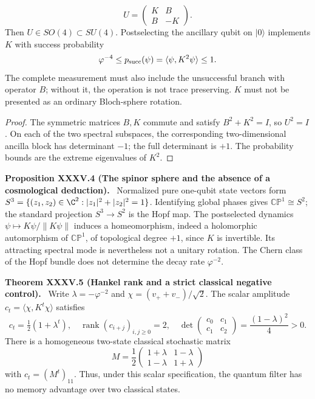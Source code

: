 \documentclass[11pt,a4paper,oneside]{book}
\DeclareMathOperator{\rank}{rank}\DeclareMathOperator{\Tr}{Tr}
\newcommand{\statement}[3]{\par\medskip\noindent\textbf{#1 #2 (#3).}\ }
\begin{document}
\[U=\begin{pmatrix}K&B\\B&-K\end{pmatrix}.\]
Then $U\in SO(4)\subset SU(4)$. Postselecting the ancillary qubit on $|0\rangle$ implements $K$ with success probability
\[\varphi^{-4}\le p_{\rm succ}(\psi)=\langle\psi,K^2\psi\rangle\le1.\]
The complete measurement must also include the unsuccessful branch with operator $B$; without it, the operation is not trace preserving. $K$ must not be presented as an ordinary Bloch-sphere rotation.
\begin{proof}
The symmetric matrices $B,K$ commute and satisfy $B^2+K^2=I$, so $U^2=I$. On each of the two spectral subspaces, the corresponding two-dimensional ancilla block has determinant $-1$; the full determinant is $+1$. The probability bounds are the extreme eigenvalues of $K^2$.
\end{proof}
\statement{Proposition}{XXXV.4}{The spinor sphere and the absence of a cosmological deduction}
Normalized pure one-qubit state vectors form $S^3=\{(z_1,z_2)\in\C^2:|z_1|^2+|z_2|^2=1\}$. Identifying global phases gives $\mathbb{CP}^1\cong S^2$; the standard projection $S^3\to S^2$ is the Hopf map. The postselected dynamics $\psi\mapsto K\psi/\|K\psi\|$ induces a homeomorphism, indeed a holomorphic automorphism of $\mathbb{CP}^1$, of topological degree $+1$, since $K$ is invertible. Its attracting spectral mode is nevertheless not a unitary rotation. The Chern class of the Hopf bundle does not determine the decay rate $\varphi^{-2}$.
\statement{Theorem}{XXXV.5}{Hankel rank and a strict classical negative control}
Write $\lambda=-\varphi^{-2}$ and $\chi=(v_++v_-)/\sqrt2$. The scalar amplitude $c_t=\langle\chi,K^t\chi\rangle$ satisfies
\begin{equation}c_t=\tfrac12(1+\lambda^t),\quad \rank(c_{i+j})_{i,j\ge0}=2,\quad
\det\begin{pmatrix}c_0&c_1\\c_1&c_2\end{pmatrix}=\frac{(1-\lambda)^2}{4}>0.\tag{123}\end{equation}
There is a homogeneous two-state classical stochastic matrix
\begin{equation}M=\frac12\begin{pmatrix}1+\lambda&1-\lambda\\1-\lambda&1+\lambda\end{pmatrix}\tag{124}\end{equation}
with $c_t=(M^t)_{11}$. Thus, under this scalar specification, the quantum filter has no memory advantage over two classical states.
\end{document}
